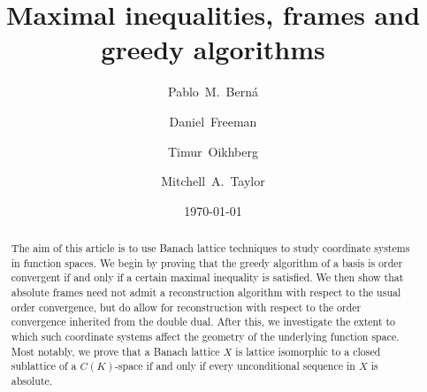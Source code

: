 \documentclass[12pt,leqno]{amsart}
\numberwithin{equation}{section}
\theoremstyle{definition}
\begin{document}
\title[Maximal inequalities, frames and greedy algorithms]
{Maximal inequalities, frames and greedy algorithms}



\author{Pablo~M.\ Bern\'a}
\address{Departamento de Matem\'aticas, CUNEF Universidad\\ Madrid 28040, Spain
} 

\author{ Daniel\ Freeman}
\address{Department of Mathematics and Statistics\\
St Louis University\\
St Louis MO 63103,  USA
} 


\author{Timur\  Oikhberg}
\address{Deptartment of Mathematics, University of Illinois, Urbana IL 61801, USA}


\author{Mitchell~A.\ Taylor}
\address{Department of Mathematics\\
ETH Z\"urich, Ramistrasse 101 8092 Z\"urich, Switzerland
} 








\date{\today}

\begin{abstract}
The aim of this article is to use Banach lattice techniques to study coordinate systems in function spaces. We begin by proving that the greedy algorithm of a basis is order convergent if and only if a certain maximal inequality is satisfied. We then show that  absolute frames need not admit a reconstruction algorithm with respect to the usual order convergence, but do allow for reconstruction with respect to the order convergence inherited from the double dual. After this, we investigate the extent to which such coordinate systems affect the geometry of the underlying function space. Most notably, we prove that a Banach lattice $X$ is lattice isomorphic to a closed sublattice of a $C(K)$-space if and only if every unconditional sequence in $X$ is absolute.

\end{abstract}
\end{document}
